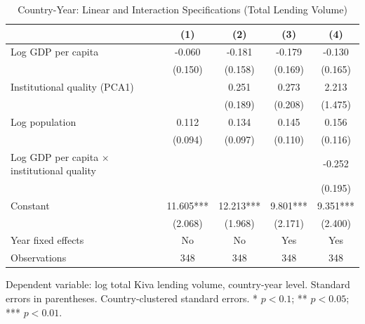 \begin{table}[htbp]
\centering
\caption{Country-Year: Linear and Interaction Specifications (Total Lending Volume)}
\label{tab:table3}
\begin{tabular}{lcccc}
\toprule
 & (1) & (2) & (3) & (4) \\
\midrule
Log GDP per capita & -0.060 & -0.181 & -0.179 & -0.130 \\
 & (0.150) & (0.158) & (0.169) & (0.165) \\
Institutional quality (PCA1) &  & 0.251 & 0.273 & 2.213 \\
 &  & (0.189) & (0.208) & (1.475) \\
Log population & 0.112 & 0.134 & 0.145 & 0.156 \\
 & (0.094) & (0.097) & (0.110) & (0.116) \\
Log GDP per capita $\times$ institutional quality &  &  &  & -0.252 \\
 &  &  &  & (0.195) \\
Constant & 11.605*** & 12.213*** & 9.801*** & 9.351*** \\
 & (2.068) & (1.968) & (2.171) & (2.400) \\
\midrule
Year fixed effects & No & No & Yes & Yes \\
Observations & 348 & 348 & 348 & 348 \\
\bottomrule
\end{tabular}
\par\smallskip\footnotesize Dependent variable: log total Kiva lending volume, country-year level. Standard errors in parentheses. Country-clustered standard errors. * $p<0.1$; ** $p<0.05$; *** $p<0.01$.
\end{table}